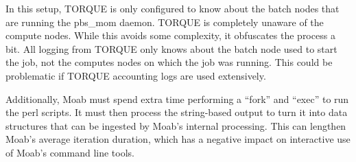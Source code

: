 In this setup, TORQUE is only configured to know about the batch nodes that are
running the pbs_mom daemon.  TORQUE is completely unaware of the compute nodes.
While this avoids some complexity, it obfuscates the process a bit.  All
logging from TORQUE only knows about the batch node used to start the job, not
the computes nodes on which the job was running.  This could be problematic if
TORQUE accounting logs are used extensively.

Additionally, Moab must spend extra time performing a ``fork'' and ``exec'' to
run the perl scripts.  It must then process the string-based output to turn it
into data structures that can be ingested by Moab's internal processing.  This
can lengthen Moab's average iteration duration, which has a negative impact on
interactive use of Moab's command line tools.
